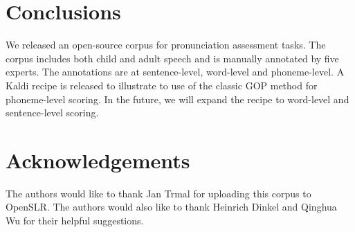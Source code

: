 \documentclass[a4paper]{article}
\begin{document}
\section{Conclusions}
We released an open-source corpus for pronunciation assessment tasks. The corpus includes both child and adult speech and is manually annotated by five experts. The annotations are at sentence-level, word-level and phoneme-level. A Kaldi recipe is released to illustrate to use of the classic GOP method for phoneme-level scoring. In the future, we will expand the recipe to word-level and sentence-level scoring.

\section{Acknowledgements}
The authors would like to thank Jan Trmal for uploading this corpus to OpenSLR. The authors would also like to thank Heinrich Dinkel and Qinghua Wu for their helpful suggestions.






\end{document}
